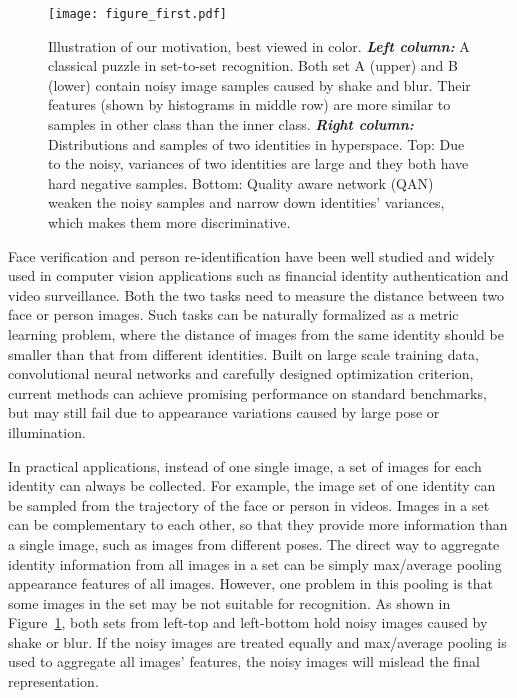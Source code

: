 \documentclass[10pt,twocolumn,letterpaper]{article}
\begin{document}
\begin{figure}[!t]
  \centering
  \texttt{[image: figure\_first.pdf]}
  \caption{Illustration of our motivation, best viewed in color. \emph{\textbf{Left column:}} A classical puzzle in set-to-set recognition. Both set A (upper) and B (lower) contain noisy image samples caused by shake and blur. Their features (shown by histograms in middle row) are more similar to samples in other class than the inner class.  \emph{\textbf{Right column:}} Distributions and samples of two identities in hyperspace. Top: Due to the noisy, variances of two identities are large and they both have hard negative samples. Bottom: Quality aware network (QAN) weaken the noisy samples and narrow down identities' variances, which makes them more discriminative.}
  \label{fig:fig1}
\end{figure}

Face verification \cite{sun2014deep1,learnedlabeled,sun2014deep,taigman2014deepface,schroff2015facenet} and person re-identification \cite{gong2014person,farenzena2010person,zheng2011person,li2014deepreid} have been well studied and widely used in computer vision applications such as financial identity authentication and video surveillance. Both the two tasks need to measure the distance between two face or person images. Such tasks can be naturally formalized as a metric learning problem, where the distance of images from the same identity should be smaller than that from different identities. Built on large scale training data, convolutional neural networks and carefully designed optimization criterion, current methods can achieve promising performance on standard benchmarks, but may still fail due to appearance variations caused by large pose or illumination.

In practical applications, instead of one single image, a set of images for each identity can always be collected. For example, the image set of one identity can be sampled from the trajectory of the face or person in videos. Images in a set can be complementary to each other, so that they provide more information than a single image, such as images from different poses. The direct way to aggregate identity information from all images in a set can be simply max/average pooling appearance features of all images. However, one problem in this pooling is that some images in the set may be not suitable for recognition. As shown in Figure~\ref{fig:fig1}, both sets from left-top and left-bottom hold noisy images caused by shake or blur. If the noisy images are treated equally and max/average pooling is used to aggregate all images' features, the noisy images will mislead the final representation.
\end{document}

